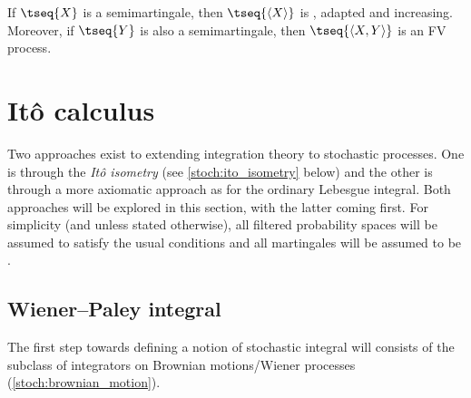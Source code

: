     \begin{property}
        If $\tseq{X}$ is a semimartingale, then $\tseq{\langle X \rangle}$ is \cdlgg, adapted and increasing. Moreover, if $\tseq{Y}$ is also a semimartingale, then $\tseq{\langle X,Y \rangle}$ is an FV process.
    \end{property}


\section{It\^o calculus}\label{section:stochastic_integral}

    Two approaches exist to extending integration theory to stochastic processes. One is through the \textit{It\^o isometry} (see \cref{stoch:ito_isometry} below) and the other is through a more axiomatic approach as for the ordinary Lebesgue integral. Both approaches will be explored in this section, with the latter coming first. For simplicity (and unless stated otherwise), all filtered probability spaces will be assumed to satisfy the usual conditions and all martingales will be assumed to be \cdlgg.

\subsection{Wiener--Paley integral}

    The first step towards defining a notion of stochastic integral will consists of the subclass of integrators on Brownian motions/Wiener processes (\cref{stoch:brownian_motion}).

